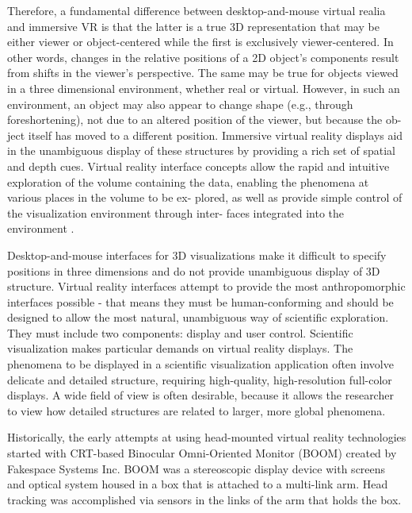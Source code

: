 Therefore, a fundamental difference between desktop-and-mouse virtual realia and immersive VR is that the latter is a true 3D representation that may be either viewer or object-centered while the first is exclusively viewer-centered. In other words, changes in the relative positions of a 2D object’s components result from shifts in the viewer’s perspective. The same may be true for objects viewed in a three dimensional environment, whether real or virtual. However, in such an environment, an object may also appear to change shape (e.g., through foreshortening), not due to an altered position of the viewer, but because the ob- ject itself has moved to a different position. Immersive virtual reality displays aid in the unambiguous display of these structures by providing a rich set of spatial and depth cues. Virtual reality interface concepts allow the rapid and intuitive exploration of the volume containing the data, enabling the phenomena at various places in the volume to be ex- plored, as well as provide simple control of the visualization environment through inter- faces integrated into the environment \citep{brysonVirtualRealityScientific}.

Desktop-and-mouse interfaces for 3D visualizations make it difficult to specify positions in three dimensions and do not provide unambiguous display of 3D structure. Virtual reality interfaces attempt to provide the most anthropomorphic interfaces possible - that means they must be human-conforming and should be designed to allow the most natural, unambiguous way of scientific exploration. They must include two components: display and user control. Scientific visualization makes particular demands on virtual reality displays. The phenomena to be displayed in a scientific visualization application often involve delicate and detailed structure, requiring high-quality, high-resolution full-color displays. A wide field of view is often desirable, because it allows the researcher to view how detailed structures are related to larger, more global phenomena.

Historically, the early attempts at using head-mounted virtual reality technologies started with CRT-based Binocular Omni-Oriented Monitor (BOOM) created by Fakespace Systems Inc. BOOM was a stereoscopic display device with screens and optical system housed in a box that is attached to a multi-link arm. Head tracking was accomplished via sensors in the links of the arm that holds the box.

